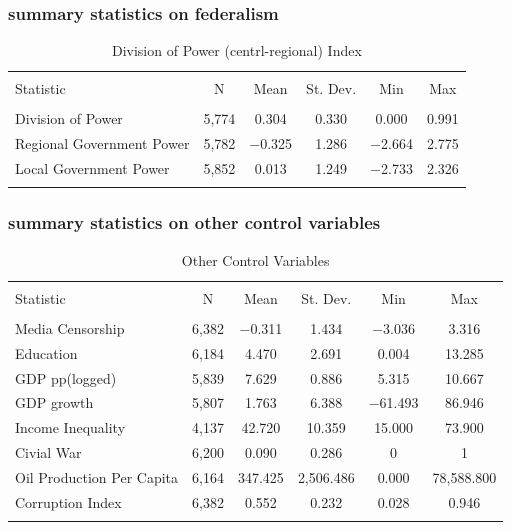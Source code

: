 \documentclass[12pt]{article}\usepackage[]{graphicx}\usepackage[]{color}
\begin{document}
\subsubsection{summary statistics on federalism}


\begin{table}[!htbp] \centering 
  \caption{Division of Power (centrl-regional) Index} 
  \label{fed} 
\begin{tabular}{@{\extracolsep{5pt}}lccccc} 
\\[-1.8ex]\hline 
\hline \\[-1.8ex] 
Statistic & \multicolumn{1}{c}{N} & \multicolumn{1}{c}{Mean} & \multicolumn{1}{c}{St. Dev.} & \multicolumn{1}{c}{Min} & \multicolumn{1}{c}{Max} \\ 
\hline \\[-1.8ex] 
Division of Power & 5,774 & 0.304 & 0.330 & 0.000 & 0.991 \\ 
Regional Government Power & 5,782 & $-$0.325 & 1.286 & $-$2.664 & 2.775 \\ 
Local Government Power & 5,852 & 0.013 & 1.249 & $-$2.733 & 2.326 \\ 
\hline \\[-1.8ex] 
\end{tabular} 
\end{table} 



\subsubsection{summary statistics on other control variables}


\begin{table}[!htbp] \centering 
  \caption{Other Control Variables} 
  \label{control} 
\begin{tabular}{@{\extracolsep{5pt}}lccccc} 
\\[-1.8ex]\hline 
\hline \\[-1.8ex] 
Statistic & \multicolumn{1}{c}{N} & \multicolumn{1}{c}{Mean} & \multicolumn{1}{c}{St. Dev.} & \multicolumn{1}{c}{Min} & \multicolumn{1}{c}{Max} \\ 
\hline \\[-1.8ex] 
Media Censorship & 6,382 & $-$0.311 & 1.434 & $-$3.036 & 3.316 \\ 
Education & 6,184 & 4.470 & 2.691 & 0.004 & 13.285 \\ 
GDP pp(logged) & 5,839 & 7.629 & 0.886 & 5.315 & 10.667 \\ 
GDP growth & 5,807 & 1.763 & 6.388 & $-$61.493 & 86.946 \\ 
Income Inequality & 4,137 & 42.720 & 10.359 & 15.000 & 73.900 \\ 
Civial War & 6,200 & 0.090 & 0.286 & 0 & 1 \\ 
Oil Production Per Capita & 6,164 & 347.425 & 2,506.486 & 0.000 & 78,588.800 \\ 
Corruption Index & 6,382 & 0.552 & 0.232 & 0.028 & 0.946 \\ 
\hline \\[-1.8ex] 
\end{tabular} 
\end{table} 
\end{document}
